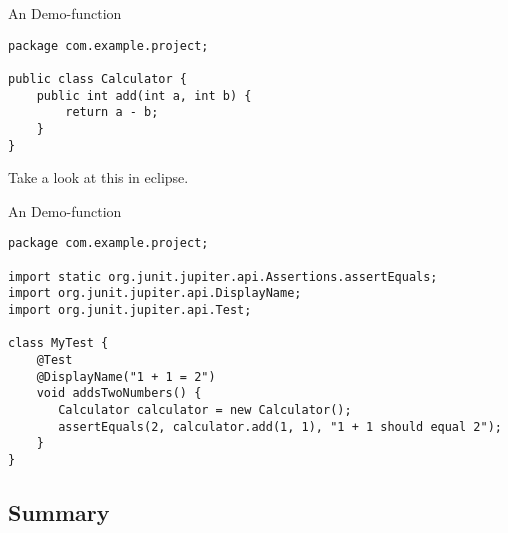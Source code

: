 \begin{frame}[containsverbatim]{An Demo-function}
\scriptsize
\lstset{language=Java}
\begin{lstlisting}[frame=single]
package com.example.project;

public class Calculator {
	public int add(int a, int b) {
		return a - b;
	}
}
\end{lstlisting}
\begin{flushright}
Take a look at this in eclipse.
\end{flushright}
\end{frame}


\begin{frame}[containsverbatim]{An Demo-function}
\scriptsize
\lstset{language=Java}
\begin{lstlisting}[frame=single]
package com.example.project;

import static org.junit.jupiter.api.Assertions.assertEquals;
import org.junit.jupiter.api.DisplayName;
import org.junit.jupiter.api.Test;

class MyTest {
	@Test
	@DisplayName("1 + 1 = 2")
	void addsTwoNumbers() {
	   Calculator calculator = new Calculator();
	   assertEquals(2, calculator.add(1, 1), "1 + 1 should equal 2");
	}
}
\end{lstlisting}
\begin{flushright}
\tiny {}
\end{flushright}
\end{frame}


\subsection{Summary}


